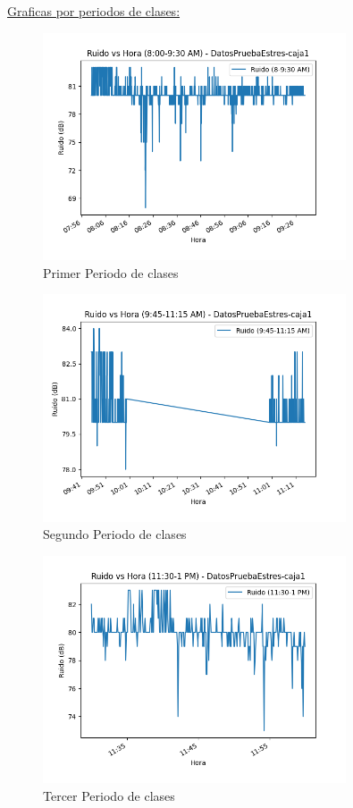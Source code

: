 \documentclass{templateNote}
\begin{document}
\newpage
\underline{Graficas por periodos de clases:}

\begin{figure}[H]
    \centering
    \includegraphics[width=0.8\textwidth]{img/DatosPruebaEstres-caja1_ruido_8_9-30_am.png}
    \caption{Primer Periodo de clases}
\end{figure}

\begin{figure}[H]
    \centering
    \includegraphics[width=0.8\textwidth]{img/DatosPruebaEstres-caja1_ruido_9-45_11-15_am.png}
    \caption{Segundo Periodo de clases}
\end{figure}

\begin{figure}[H]
    \centering
    \includegraphics[width=0.8\textwidth]{img/DatosPruebaEstres-caja1_ruido_11-30_1_pm.png}
    \caption{Tercer Periodo de clases}
\end{figure}
\end{document}
